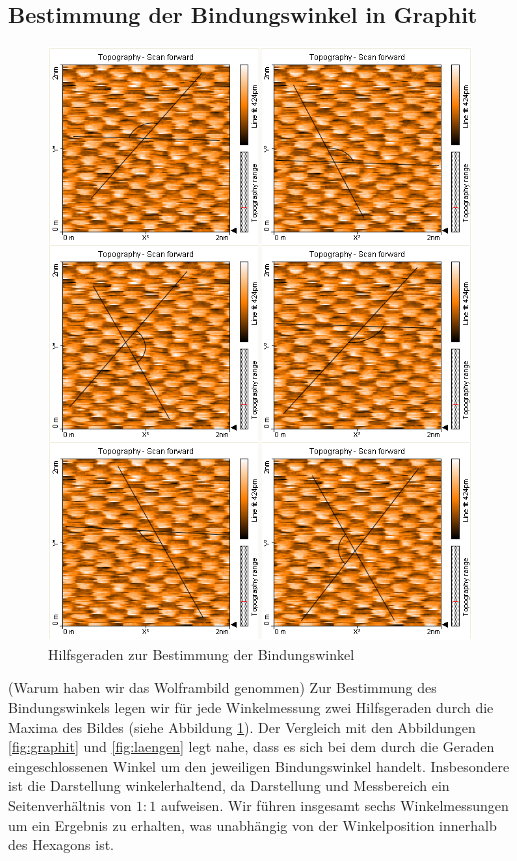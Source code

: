 \documentclass[10pt, a4paper]{article}
\begin{document}
\subsection{Bestimmung der Bindungswinkel in Graphit}
\begin{figure}[h]
\centering
\includegraphics[width=1\textwidth]{./grafiken/collage.png}
\caption{Hilfsgeraden zur Bestimmung der Bindungswinkel}
\label{fig:hilfsgeraden}
\end{figure}
(Warum haben wir das Wolframbild genommen)
Zur Bestimmung des Bindungswinkels legen wir für jede Winkelmessung zwei Hilfsgeraden durch die Maxima des Bildes (siehe Abbildung \ref{fig:hilfsgeraden}).
Der Vergleich mit den Abbildungen \ref{fig:graphit} und \ref{fig:laengen} legt nahe, dass es sich bei dem durch die Geraden eingeschlossenen Winkel um den jeweiligen Bindungswinkel handelt.
Insbesondere ist die Darstellung winkelerhaltend, da Darstellung und Messbereich ein Seitenverhältnis von $1:1$ aufweisen.
Wir führen insgesamt sechs Winkelmessungen um ein Ergebnis zu erhalten, was unabhängig von der Winkelposition innerhalb des Hexagons ist.
\end{document}
